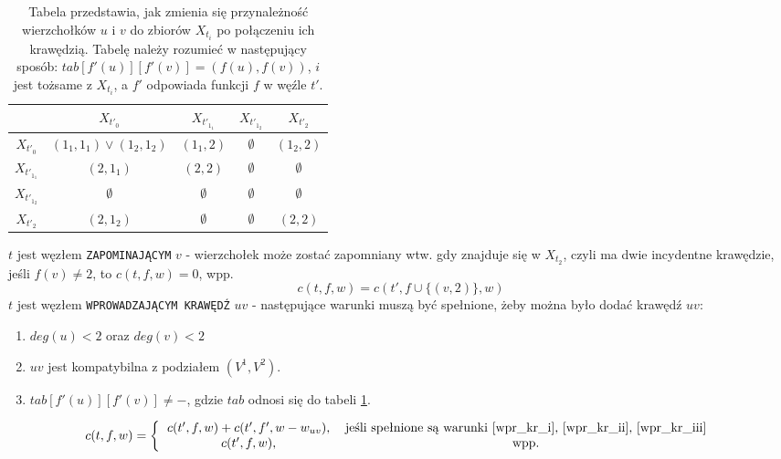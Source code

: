 \documentclass[12pt, oneside]{report}
\begin{document}
\begin{table}
\centering
\begin{tabular}{c|c|c|c|c}
 & $X_{t'_0}$ & $X_{t'_{1_1}}$ & $X_{t'_{1_2}}$ & $X_{t'_2}$ \\
\hline
$X_{t'_0}$ & $(1_1,1_1) \vee (1_2,1_2)$ & $(1_1,2)$ & $\emptyset$ & $(1_2,2)$ \\
\hline
$X_{t'_{1_1}}$ & $(2,1_1)$ & $(2,2)$ & $\emptyset$ & $\emptyset$ \\
\hline
$X_{t'_{1_2}}$ & $\emptyset$ & $\emptyset$ & $\emptyset$ & $\emptyset$ \\
\hline
$X_{t'_2}$ & $(2,1_2)$ & $\emptyset$ & $\emptyset$ & $(2,2)$ \\
\end{tabular}
\caption{Tabela przedstawia, jak zmienia się przynależność wierzchołków $u$ i $v$ do zbiorów $X_{t_i}$ po połączeniu ich krawędzią. Tabelę należy rozumieć w następujący sposób: $tab[f'(u)][f'(v)] = (f(u), f(v))$, $i$ jest tożsame z $X_{t_i}$, a $f'$ odpowiada funkcji $f$ w węźle $t'$.}
\label{add_edge_table}
\end{table}
$$$$
$t$ jest węzłem \texttt{ZAPOMINAJĄCYM} $v$ - wierzchołek może zostać zapomniany wtw. gdy znajduje się w $X_{t_2}$, czyli ma dwie incydentne krawędzie, jeśli $f(v) \neq 2$, to $c(t,f,w) = 0$, wpp.
$$c(t,f,w) = c(t',f \cup \{(v,2)\},w)$$
\newline
$t$ jest węzłem \texttt{WPROWADZAJĄCYM KRAWĘDŹ} $uv$ - następujące warunki muszą być spełnione, żeby można było dodać krawędź $uv$:
\begin{enumerate}[label=(\roman*)]
\item \label{wpr_kr_i}$deg(u) < 2$ oraz $deg(v) < 2$
\item \label{wpr_kr_ii}$uv$ jest kompatybilna z podziałem $(V^1, V^2)$.
\item \label{wpr_kr_iii}$tab[f'(u)][f'(v)] \neq -$, gdzie $tab$ odnosi się do tabeli \ref{add_edge_table}.  
\end{enumerate}

\[
c(t,f,w) =  
\left \{
  \begin{tabular}{ccc}
  $c(t',f,w) + c(t',f',w - w_{uv})$, & jeśli spełnione są warunki \ref{wpr_kr_i}, \ref{wpr_kr_ii}, \ref{wpr_kr_iii}\\
  $c(t',f,w)$, &  wpp.
  \end{tabular}
\right. 
\]
\end{document}
